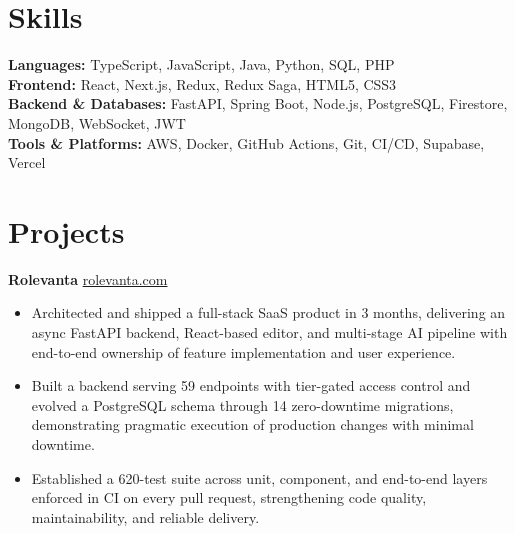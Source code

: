 \documentclass[11pt]{article}       %
\begin{document}
\vspace{-10.5pt}

\section*{Skills}
\textbf{Languages:} TypeScript, JavaScript, Java, Python, SQL, PHP \\
\textbf{Frontend:} React, Next.js, Redux, Redux Saga, HTML5, CSS3 \\
\textbf{Backend \& Databases:} FastAPI, Spring Boot, Node.js, PostgreSQL, Firestore, MongoDB, WebSocket, JWT \\
\textbf{Tools \& Platforms:} AWS, Docker, GitHub Actions, Git, CI/CD, Supabase, Vercel
\vspace{-5pt}






\section*{Projects}
\textbf{Rolevanta} \hfill \href{https://rolevanta.com}{rolevanta.com} \\
\vspace{-9pt}
\begin{itemize}
  \item Architected and shipped a full-stack SaaS product in 3 months, delivering an async FastAPI backend, React-based editor, and multi-stage AI pipeline with end-to-end ownership of feature implementation and user experience.
  \item Built a backend serving 59 endpoints with tier-gated access control and evolved a PostgreSQL schema through 14 zero-downtime migrations, demonstrating pragmatic execution of production changes with minimal downtime.
  \item Established a 620-test suite across unit, component, and end-to-end layers enforced in CI on every pull request, strengthening code quality, maintainability, and reliable delivery.
\end{itemize}
\end{document}
